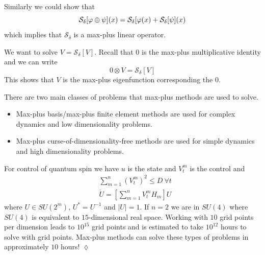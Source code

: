 Similarly we could show that
$$\mathcal{S}_\delta[\varphi\oplus\psi](x) = \mathcal{S}_\delta[\varphi(x) + \mathcal{S}_\delta[\psi](x)$$
which implies that $\mathcal{S}_\delta$ is a max-plus linear operator.

We want to solve $V=\mathcal{S}_\delta[V]$. Recall that $0$ is the max-plus multiplicative identity and we can write
$$0\otimes V=\mathcal{S}_\delta[V]$$
This shows that $V$ is the max-plus eigenfunction corresponding the $0$.

There are two main classes of problems that max-plus methods are used to solve.
\begin{itemize}
\item Max-plus basis/max-plus finite element methods are used for complex dynamics and low dimensionality problems.
\item Max-plus curse-of-dimensionality-free methods are used for simple dynamics and high dimensionality problems.
\end{itemize}

\begin{example}
For control of quantum spin we have $u$ is the state and $V_t^m$ is the control and
\begin{align*}
&\sum_{m=1}^n(V_t^m)^2\leq D ~\forall t \\
&\dot{U} = \left[\sum_{m=1}^nV_t^mH_m\right]U
\end{align*}
where $U\in SU(2^m)$, $U^\ast=U^{-1}$ and $|U|=1$. If $n=2$ we are in $SU(4)$ where $SU(4)$ is equivalent to $15$-dimensional real space. Working with $10$ grid points per dimension leads to $10^{15}$ grid points and is estimated to take $10^{12}$ hours to solve with grid points. Max-plus methods can solve these types of problems in approximately $10$ hours!
$\lozenge$
\end{example}
